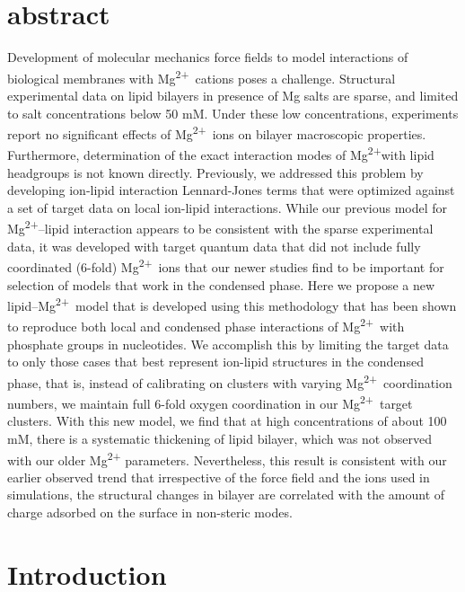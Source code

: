 \documentclass[12pt,openany,final]{book}
\newcommand{\mg}{Mg\textsuperscript{2+}}
\begin{document}
\section{abstract}

Development of molecular mechanics force fields to model interactions of biological membranes with \mg~cations poses a challenge.
Structural experimental data on lipid bilayers in presence of Mg salts are sparse, and limited to salt concentrations below 50 mM.
Under these low concentrations, experiments report no significant effects of \mg~ions  on bilayer macroscopic properties.
Furthermore, determination of the exact interaction modes of \mg with lipid headgroups is not known directly.
Previously, we addressed this problem by developing ion-lipid interaction
Lennard-Jones terms that were optimized against a set of target data on local ion-lipid interactions.
While our previous model for \mg--lipid interaction appears to be consistent with the sparse experimental data,
it was developed with target quantum data that did not include fully coordinated (6-fold) \mg~ions that our newer studies find to be important for selection of models that work in the condensed phase.
Here we propose a new lipid--\mg~model that
is developed using this methodology that has been shown to reproduce both local and condensed phase interactions of \mg~with phosphate groups in nucleotides.
We accomplish this by limiting the target data to only those cases that best represent ion-lipid structures in the condensed phase,
that is, instead of calibrating on clusters with varying \mg~coordination numbers, we maintain full 6-fold oxygen coordination in our
\mg~target clusters. With this new model, we find that at high concentrations of about 100 mM, there is a
systematic thickening of lipid bilayer, which was not observed with our older \mg{} parameters. Nevertheless,
this result is consistent with our earlier observed trend that irrespective of the force field and the ions used in simulations,
the structural changes in bilayer are correlated with the amount of charge adsorbed on the surface in non-steric modes.



\section{Introduction}
\end{document}
